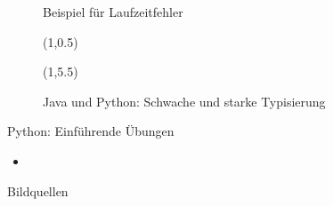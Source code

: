 \documentclass[aspectratio=169,t]{beamer}
\begin{document}
\begin{frame}[fragile]{}
{\begin{textblock}{10}
\begin{figure}
                \caption{Beispiel für Laufzeitfehler}
            \end{figure}
        \end{textblock}    
    }
     {
        \begin{figure}
            \begin{textblock}{14}(1,0.5)
                
            \end{textblock}    
            \begin{textblock}{14}(1,5.5)
                
                \caption{Java und Python: Schwache und starke Typisierung}
            \end{textblock}    
        \end{figure}
    }
\end{frame}

\begin{frame}{Python: Einführende Übungen}
    \begin{itemize}
        \item 
    \end{itemize}
\end{frame}


\begin{frame}[allowframebreaks]{Bildquellen}
\printbibliography
\end{frame}
\end{document}
